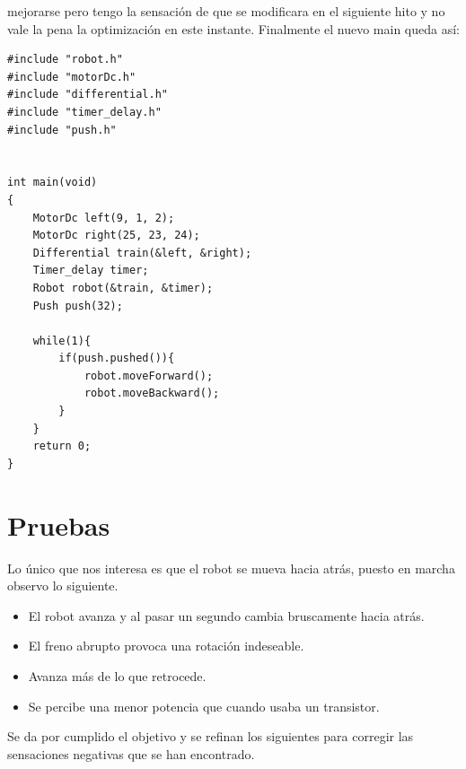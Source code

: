 mejorarse pero tengo la sensación de que se modificara en el siguiente hito y no
vale la pena la optimización en este instante. Finalmente el nuevo main queda así:
\begin{verbatim}
#include "robot.h"
#include "motorDc.h"
#include "differential.h"
#include "timer_delay.h"
#include "push.h"


int main(void)
{
	MotorDc left(9, 1, 2);
	MotorDc right(25, 23, 24);
	Differential train(&left, &right);
	Timer_delay timer;
	Robot robot(&train, &timer);
	Push push(32);

	while(1){
		if(push.pushed()){
			robot.moveForward();
			robot.moveBackward();
		}
	}
	return 0;
}
\end{verbatim}
\section{Pruebas}
Lo único que nos interesa es que el robot se mueva hacia atrás, puesto en marcha
observo lo siguiente.
\begin{itemize}
	\item El robot avanza y al pasar un segundo cambia bruscamente hacia 
		atrás.
	\item El freno abrupto provoca una rotación indeseable.
	\item Avanza más de lo que retrocede.
	\item Se percibe una menor potencia que cuando usaba un transistor.
\end{itemize}
Se da por cumplido el objetivo y se refinan los siguientes para corregir las 
sensaciones negativas que se han encontrado.
